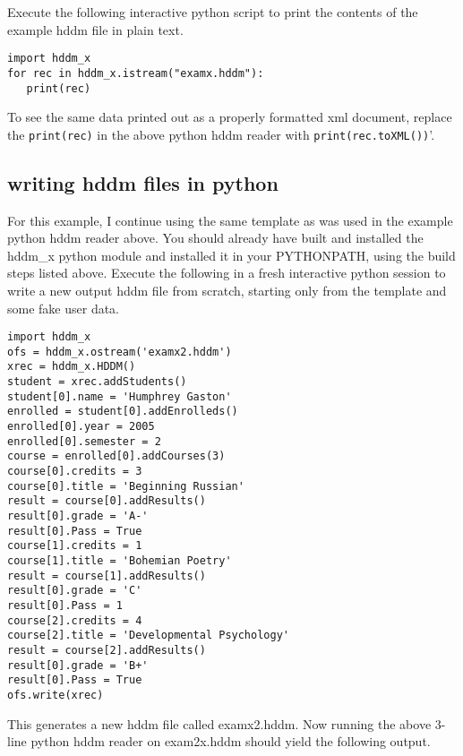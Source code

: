 \documentclass{revtex4}
\begin{document}
Execute the following interactive python script to print the contents of the
example hddm file in plain text.

\vspace{1cm}
\begin{minipage}{12cm}
\begin{verbatim}
import hddm_x
for rec in hddm_x.istream("examx.hddm"):
   print(rec)
\end{verbatim}
\end{minipage}
\vspace{1cm}

To see the same data printed out as a properly formatted xml document, replace
the \texttt{print(rec)} in the above python hddm reader with 
\texttt{print(rec.toXML())}'. 

\subsection{writing hddm files in python}

For this example, I continue using the same template as was used in the
example python hddm reader above. You should already have built and installed
the hddm\_x python module and installed it in your PYTHONPATH, using the build
steps listed above. Execute the following in a fresh interactive python session
to write a new output hddm file from scratch, starting only from the template
and some fake user data.

\vspace{1cm}
\begin{minipage}{12cm}
\begin{verbatim}
import hddm_x
ofs = hddm_x.ostream('examx2.hddm')
xrec = hddm_x.HDDM()
student = xrec.addStudents()
student[0].name = 'Humphrey Gaston'
enrolled = student[0].addEnrolleds()
enrolled[0].year = 2005
enrolled[0].semester = 2
course = enrolled[0].addCourses(3)
course[0].credits = 3
course[0].title = 'Beginning Russian'
result = course[0].addResults()
result[0].grade = 'A-'
result[0].Pass = True
course[1].credits = 1
course[1].title = 'Bohemian Poetry'
result = course[1].addResults()
result[0].grade = 'C'
result[0].Pass = 1
course[2].credits = 4
course[2].title = 'Developmental Psychology'
result = course[2].addResults()
result[0].grade = 'B+'
result[0].Pass = True
ofs.write(xrec)
\end{verbatim}
\end{minipage}
\vspace{1cm}

This generates a new hddm file called examx2.hddm. Now running the above 3-{}line
python hddm reader on exam2x.hddm should yield the following output.
\end{document}
